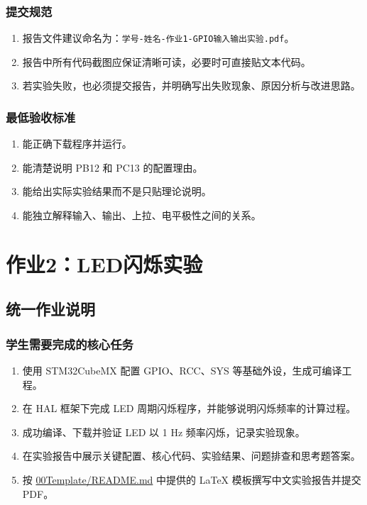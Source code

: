 \documentclass[
  chinese,
  UTF8,
  oneside,
  openany]{ctexbook}
\providecommand{\tightlist}{%
  \setlength{\itemsep}{0pt}\setlength{\parskip}{0pt}}
\begin{document}
\subsection{提交规范}\label{ux63d0ux4ea4ux89c4ux8303}

\begin{enumerate}
\def\labelenumi{\arabic{enumi}.}
\tightlist
\item
  报告文件建议命名为：\texttt{学号-姓名-作业1-GPIO输入输出实验.pdf}。
\item
  报告中所有代码截图应保证清晰可读，必要时可直接贴文本代码。
\item
  若实验失败，也必须提交报告，并明确写出失败现象、原因分析与改进思路。
\end{enumerate}

\subsection{最低验收标准}\label{ux6700ux4f4eux9a8cux6536ux6807ux51c6}

\begin{enumerate}
\def\labelenumi{\arabic{enumi}.}
\tightlist
\item
  能正确下载程序并运行。
\item
  能清楚说明 PB12 和 PC13 的配置理由。
\item
  能给出实际实验结果而不是只贴理论说明。
\item
  能独立解释输入、输出、上拉、电平极性之间的关系。
\end{enumerate}

\chapter{作业2：LED闪烁实验}\label{ux4f5cux4e1a2ledux95eaux70c1ux5b9eux9a8c}

\section{统一作业说明}\label{ux7edfux4e00ux4f5cux4e1aux8bf4ux660e-1}

\subsection{学生需要完成的核心任务}\label{ux5b66ux751fux9700ux8981ux5b8cux6210ux7684ux6838ux5fc3ux4efbux52a1-1}

\begin{enumerate}
\def\labelenumi{\arabic{enumi}.}
\tightlist
\item
  使用 STM32CubeMX 配置 GPIO、RCC、SYS 等基础外设，生成可编译工程。
\item
  在 HAL 框架下完成 LED 周期闪烁程序，并能够说明闪烁频率的计算过程。
\item
  成功编译、下载并验证 LED 以 1 Hz 频率闪烁，记录实验现象。
\item
  在实验报告中展示关键配置、核心代码、实验结果、问题排查和思考题答案。
\item
  按 \href{../00Template/README.md}{00Template/README.md} 中提供的 LaTeX
  模板撰写中文实验报告并提交 PDF。
\end{enumerate}
\end{document}
